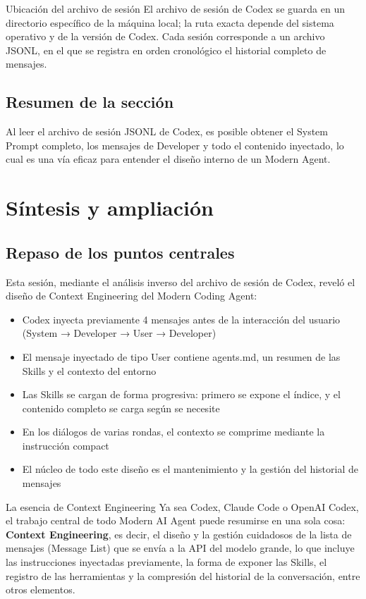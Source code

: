 \documentclass[a4paper]{article}
\begin{document}
\begin{warningbox}{Ubicación del archivo de sesión}
El archivo de sesión de Codex se guarda en un directorio específico de la máquina local; la ruta exacta depende del sistema operativo y de la versión de Codex. Cada sesión corresponde a un archivo JSONL, en el que se registra en orden cronológico el historial completo de mensajes.
\end{warningbox}

\subsection{Resumen de la sección}

Al leer el archivo de sesión JSONL de Codex, es posible obtener el System Prompt completo, los mensajes de Developer y todo el contenido inyectado, lo cual es una vía eficaz para entender el diseño interno de un Modern Agent.

\section{Síntesis y ampliación}

\subsection{Repaso de los puntos centrales}

Esta sesión, mediante el análisis inverso del archivo de sesión de Codex, reveló el diseño de Context Engineering del Modern Coding Agent:

\begin{itemize}
    \item Codex inyecta previamente 4 mensajes antes de la interacción del usuario (System → Developer → User → Developer)
    \item El mensaje inyectado de tipo User contiene agents.md, un resumen de las Skills y el contexto del entorno
    \item Las Skills se cargan de forma progresiva: primero se expone el índice, y el contenido completo se carga según se necesite
    \item En los diálogos de varias rondas, el contexto se comprime mediante la instrucción compact
    \item El núcleo de todo este diseño es el mantenimiento y la gestión del historial de mensajes
\end{itemize}

\begin{importantbox}{La esencia de Context Engineering}
Ya sea Codex, Claude Code o OpenAI Codex, el trabajo central de todo Modern AI Agent puede resumirse en una sola cosa: \textbf{Context Engineering}, es decir, el diseño y la gestión cuidadosos de la lista de mensajes (Message List) que se envía a la API del modelo grande, lo que incluye las instrucciones inyectadas previamente, la forma de exponer las Skills, el registro de las herramientas y la compresión del historial de la conversación, entre otros elementos.
\end{importantbox}
\end{document}
